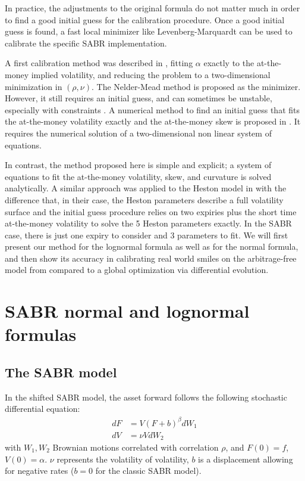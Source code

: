 \documentclass[]{rAMF2e}
\begin{document}
In practice, the adjustments to the original formula do not matter much in order to find a good initial guess for the calibration procedure. Once a good initial guess is found, a fast local minimizer like Levenberg-Marquardt can be used to calibrate the specific SABR implementation. 

A first calibration method was described in \citep{west2005calibration}, fitting $\alpha$ exactly to the at-the-money implied volatility, and reducing the problem to a two-dimensional minimization in $(\rho,\nu)$. The Nelder-Mead method is proposed as the minimizer. However, it still requires an initial guess, and can sometimes be unstable, especially with constraints \citep{lefloch2014nelder}. A numerical method to find an initial guess that fits the at-the-money volatility exactly and the at-the-money skew is proposed in \citep{gauthier2009fitting}. It requires the numerical solution of a two-dimensional non linear system of equations.

In contrast, the method proposed here is simple and explicit; a system of equations to fit the at-the-money volatility, skew, and curvature is solved analytically. A similar approach was applied to the Heston model in \citep{forde2012small} with the difference that, in their case, the Heston parameters describe a full volatility surface and the initial guess procedure relies on two expiries plus the short time at-the-money volatility to solve the 5 Heston parameters exactly. In the SABR case, there is just one expiry to consider and 3 parameters to fit. We will first present our method for the lognormal formula as well as for the normal formula, and then show its accuracy in calibrating real world smiles on the arbitrage-free model from \citet{hagan2013arbitrage} compared to a global optimization via differential evolution.


\section{SABR normal and lognormal formulas}

\subsection{The SABR model}
In the shifted SABR model, the asset forward follows the following stochastic differential equation:
\begin{align}
dF &= V (F+b)^\beta dW_1\\
dV &= \nu V dW_2
\end{align}
with $W_1, W_2$ Brownian motions correlated with correlation $\rho$,
and $F(0) = f$, $V(0) = \alpha$.
$\nu$ represents the volatility of volatility, $b$ is a displacement allowing for negative rates ($b=0$ for the classic SABR model).
\end{document}
